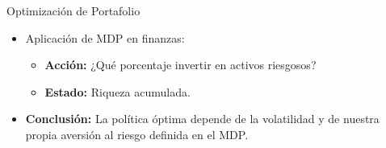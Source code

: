 \documentclass[handout]{beamer}
\begin{document}
\begin{frame}{Optimización de Portafolio}
\begin{itemize}
    \item Aplicación de MDP en finanzas:
    \begin{itemize}
        \item \textbf{Acción:} ¿Qué porcentaje invertir en activos riesgosos?
        \item \textbf{Estado:} Riqueza acumulada.
    \end{itemize}
    \item \textbf{Conclusión:} La política óptima depende de la volatilidad y de nuestra propia aversión al riesgo definida en el MDP.
\end{itemize}
\end{frame}
\end{document}
